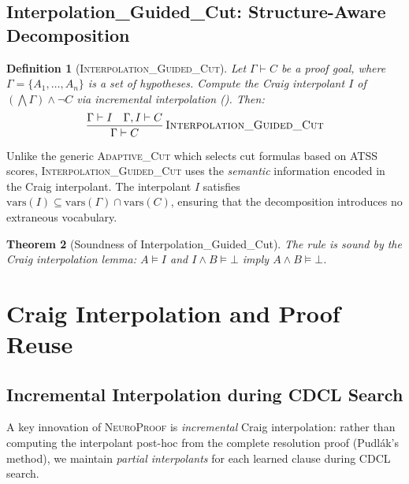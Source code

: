 \documentclass[conference]{IEEEtran}
\newtheorem{theorem}{Theorem}[section]
\newtheorem{definition}[theorem]{Definition}
\newcommand{\NP}{\textsc{NeuroProof}}
\newcommand{\infrule}[3]{
  \dfrac{\displaystyle #2}{\displaystyle #3}\,\textsc{#1}
}
\begin{document}
\subsection{Interpolation\_Guided\_Cut: Structure-Aware Decomposition}

\begin{definition}[\textsc{Interpolation\_Guided\_Cut}]
  \label{def:interpolation-cut}
  Let $\Gamma \vdash C$ be a proof goal, where $\Gamma = \{A_1,
  \dots, A_n\}$ is a set of hypotheses.  Compute the Craig interpolant
  $I$ of $(\bigwedge \Gamma) \land \neg C$ via incremental
  interpolation ().  Then:
  \begin{equation}
    \infrule{\textsc{Interpolation\_Guided\_Cut}}
          {\Gamma \vdash I \quad \Gamma, I \vdash C}
          {\Gamma \vdash C}
  \end{equation}
\end{definition}

Unlike the generic \textsc{Adaptive\_Cut} which selects cut formulas
based on ATSS scores, \textsc{Interpolation\_Guided\_Cut} uses the
\emph{semantic} information encoded in the Craig interpolant.  The
interpolant $I$ satisfies $\mathrm{vars}(I) \subseteq
\mathrm{vars}(\Gamma) \cap \mathrm{vars}(C)$, ensuring that the
decomposition introduces no extraneous vocabulary.

\begin{theorem}[Soundness of Interpolation\_Guided\_Cut]
  The rule is sound by the Craig interpolation lemma: $A \models I$
  and $I \land B \models \bot$ imply $A \land B \models \bot$.
\end{theorem}

\section{Craig Interpolation and Proof Reuse}
\label{sec:interpolation}

\subsection{Incremental Interpolation during CDCL Search}
\label{sec:incremental-interpolation}

A key innovation of \NP{} is \emph{incremental} Craig interpolation:
rather than computing the interpolant post-hoc from the complete
resolution proof (Pudl\'{a}k's method), we maintain \emph{partial
interpolants} for each learned clause during CDCL search.
\end{document}
